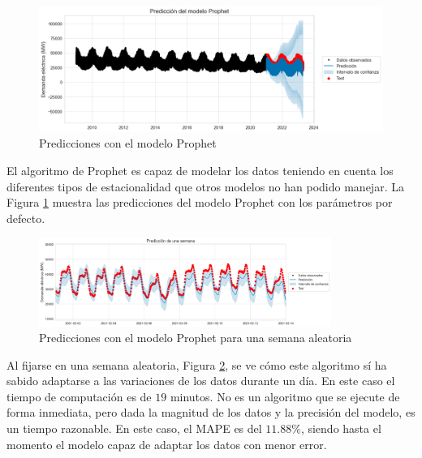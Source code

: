 \documentclass[12pt,twoside]{article}
\begin{document}
\begin{figure}[h]
\centering
    \includegraphics[width = \textwidth]{imagenes/prophet_predition.png}
    \caption{Predicciones con el modelo Prophet}\label{fig:prophet_predition}
\end{figure}

El algoritmo de Prophet es capaz de modelar los datos teniendo en cuenta los diferentes tipos de estacionalidad que otros modelos no han podido manejar. La Figura \ref{fig:prophet_predition} muestra las predicciones del modelo Prophet con los parámetros por defecto. 
\begin{figure}[h]
\centering
    \includegraphics[width = 0.85\textwidth]{imagenes/prophet_oneweek_pred.png}
    \caption{Predicciones con el modelo Prophet para una semana aleatoria}\label{fig:prophet_oneweek_pred}
\end{figure}


Al fijarse en una semana aleatoria, Figura \ref{fig:prophet_oneweek_pred}, se ve cómo este algoritmo sí ha sabido adaptarse a las variaciones de los datos durante un día. En este caso el tiempo de computación es de $19$ minutos. No es un algoritmo que se ejecute de forma inmediata, pero dada la magnitud de los datos y la precisión del modelo, es un tiempo razonable. En este caso, el MAPE es del $11.88\%$, siendo hasta el momento el modelo capaz de adaptar los datos con menor error.
\end{document}
